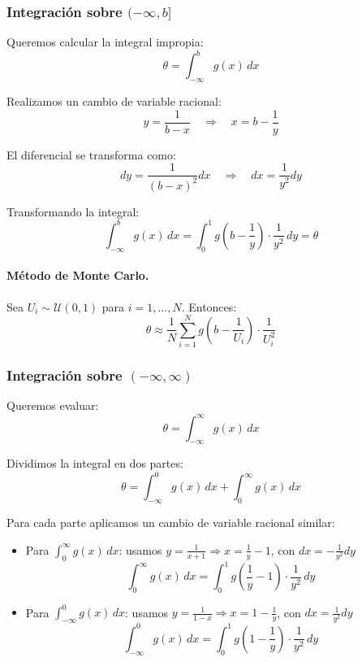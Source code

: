 \documentclass[11pt, a4paper]{article}
\theoremstyle{definition}
\begin{document}
\subsubsection{Integración sobre $(-\infty, b]$}

Queremos calcular la integral impropia:
\[
\theta = \int_{-\infty}^{b} g(x) \, dx
\]

Realizamos un cambio de variable racional:
\[
y = \frac{1}{b - x} \quad \Rightarrow \quad x = b - \frac{1}{y}
\]

El diferencial se transforma como:
\[
dy = \frac{1}{(b - x)^2}dx \quad \Rightarrow \quad dx = \frac{1}{y^2}dy
\]

Transformando la integral:
\[
\int_{-\infty}^{b} g(x) \, dx = \int_{0}^{1} g\left(b - \frac{1}{y}\right) \cdot \frac{1}{y^2} \, dy = \theta
\]

\paragraph{Método de Monte Carlo.} Sea $U_i \sim \mathcal{U}(0,1)$ para $i = 1, \ldots, N$. Entonces:
\[
\theta \approx \frac{1}{N} \sum_{i=1}^{N} g\left(b - \frac{1}{U_i}\right) \cdot \frac{1}{U_i^2}
\]


\subsubsection{Integración sobre $(-\infty, \infty)$}

Queremos evaluar:
\[
\theta = \int_{-\infty}^{\infty} g(x) \, dx
\]

Dividimos la integral en dos partes:
\[
\theta = \int_{-\infty}^{0} g(x) \, dx + \int_{0}^{\infty} g(x) \, dx
\]

Para cada parte aplicamos un cambio de variable racional similar:

\begin{itemize}
\item Para $\displaystyle \int_{0}^{\infty} g(x)\, dx$: usamos $y = \frac{1}{x+1} \Rightarrow x = \frac{1}{y} - 1$, con $dx = -\frac{1}{y^2} dy$
\[
\int_{0}^{\infty} g(x)\, dx = \int_{0}^{1} g\left(\frac{1}{y} - 1\right)\cdot \frac{1}{y^2} \, dy
\]

\item Para $\displaystyle \int_{-\infty}^{0} g(x)\, dx$: usamos $y = \frac{1}{1 - x} \Rightarrow x = 1 - \frac{1}{y}$, con $dx = \frac{1}{y^2}dy$
\[
\int_{-\infty}^{0} g(x)\, dx = \int_{0}^{1} g\left(1 - \frac{1}{y} \right) \cdot \frac{1}{y^2} \, dy
\]
\end{itemize}
\end{document}
